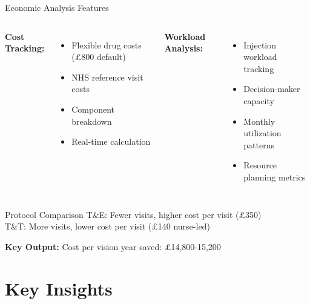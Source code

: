 \documentclass[10pt,aspectratio=169]{beamer}
\begin{document}
\begin{frame}{Economic Analysis Features}
\begin{columns}[T]
\textbf{Cost Tracking:}
\begin{itemize}
    \item Flexible drug costs (£800 default)
    \item NHS reference visit costs
    \item Component breakdown
    \item Real-time calculation
\end{itemize}

\textbf{Workload Analysis:}
\begin{itemize}
    \item Injection workload tracking
    \item Decision-maker capacity
    \item Monthly utilization patterns
    \item Resource planning metrics
\end{itemize}
\end{columns}

\vspace{0.5cm}
\begin{block}{Protocol Comparison}
T\&E: Fewer visits, higher cost per visit (£350)\\
T\&T: More visits, lower cost per visit (£140 nurse-led)
\end{block}

\vspace{0.3cm}
\textbf{Key Output:} Cost per vision year saved: £14,800-15,200
\end{frame}

\section{Key Insights}
\end{document}
